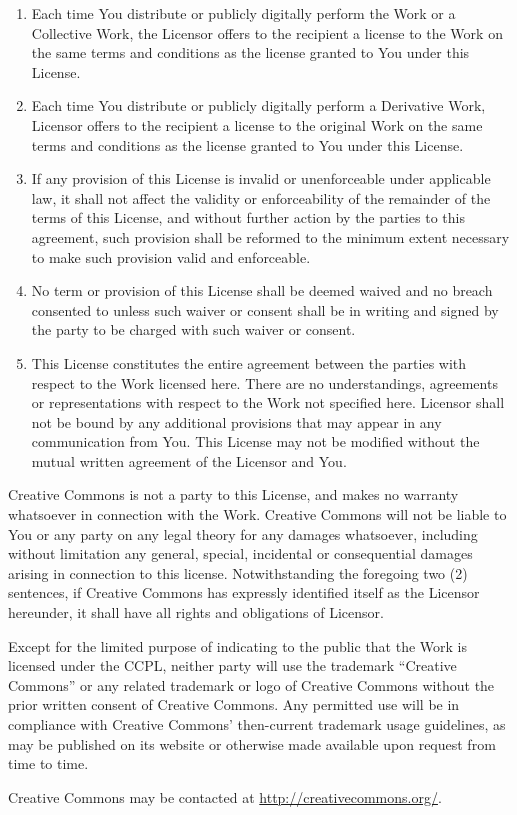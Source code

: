 \begin{enumerate}
\begin{enumerate}
\item Each time You distribute or publicly digitally perform the Work
or a Collective Work, the Licensor offers to the recipient a license
to the Work on the same terms and conditions as the license granted to
You under this License.
\item Each time You distribute or publicly digitally perform a
Derivative Work, Licensor offers to the recipient a license to the
original Work on the same terms and conditions as the license granted
to You under this License.
\item If any provision of this License is invalid or unenforceable
under applicable law, it shall not affect the validity or
enforceability of the remainder of the terms of this License, and
without further action by the parties to this agreement, such
provision shall be reformed to the minimum extent necessary to make
such provision valid and enforceable.
\item No term or provision of this License shall be deemed waived and
no breach consented to unless such waiver or consent shall be in
writing and signed by the party to be charged with such waiver or
consent.
\item This License constitutes the entire agreement between the
parties with respect to the Work licensed here. There are no
understandings, agreements or representations with respect to the Work
not specified here. Licensor shall not be bound by any additional
provisions that may appear in any communication from You. This License
may not be modified without the mutual written agreement of the
Licensor and You.
\end{enumerate}
\end{enumerate}

\begin{framed}
Creative Commons is not a party to this License, and makes no warranty
whatsoever in connection with the Work. Creative Commons will not be
liable to You or any party on any legal theory for any damages
whatsoever, including without limitation any general, special,
incidental or consequential damages arising in connection to this
license. Notwithstanding the foregoing two (2) sentences, if Creative
Commons has expressly identified itself as the Licensor hereunder, it
shall have all rights and obligations of Licensor.


Except for the limited purpose of indicating to the public that the
Work is licensed under the CCPL, neither party will use the trademark
``Creative Commons'' or any related trademark or logo of Creative
Commons without the prior written consent of Creative Commons. Any
permitted use will be in compliance with Creative Commons'
then-current trademark usage guidelines, as may be published on its
website or otherwise made available upon request from time to time.


Creative Commons may be contacted at \url{http://creativecommons.org/}.
\end{framed}
